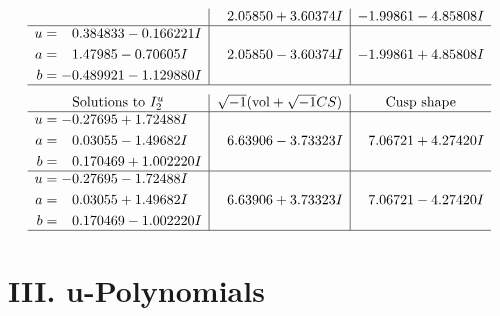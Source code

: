\documentclass[1p]{elsarticle_modified}
\theoremstyle{definition}
\newcommand{\I}{\sqrt{-1}}
\begin{document}
$$\begin{array}{c|c|c}
 & \phantom{-}2.05850 + 3.60374 I & -1.99861 - 4.85808 I \\ \hline\begin{aligned}
u &= \phantom{-}0.384833 - 0.166221 I \\
a &= \phantom{-}1.47985 - 0.70605 I \\
b &= -0.489921 - 1.129880 I\end{aligned}
 & \phantom{-}2.05850 - 3.60374 I & -1.99861 + 4.85808 I\\
 \hline 
 \end{array}$$\newpage$$\begin{array}{c|c|c}  
\text{Solutions to }I^u_{2}& \I (\text{vol} + \sqrt{-1}CS) & \text{Cusp shape}\\
 \hline 
\begin{aligned}
u &= -0.27695 + 1.72488 I \\
a &= \phantom{-}0.03055 - 1.49682 I \\
b &= \phantom{-}0.170469 + 1.002220 I\end{aligned}
 & \phantom{-}6.63906 - 3.73323 I & \phantom{-}7.06721 + 4.27420 I \\ \hline\begin{aligned}
u &= -0.27695 - 1.72488 I \\
a &= \phantom{-}0.03055 + 1.49682 I \\
b &= \phantom{-}0.170469 - 1.002220 I\end{aligned}
 & \phantom{-}6.63906 + 3.73323 I & \phantom{-}7.06721 - 4.27420 I\\
 \hline 
 \end{array}$$\newpage
\newpage\renewcommand{\arraystretch}{1}
\centering \section*{ III. u-Polynomials}
\end{document}
